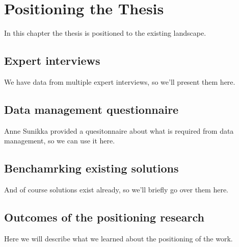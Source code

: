 \chapter{Positioning the Thesis}
\label{chapter:positioning}

In this chapter the thesis is positioned to the existing landscape.

\section{Expert interviews}
\label{sec:expert_interviews}

We have data from multiple expert interviews, so we'll present them here.

\section{Data management questionnaire}
\label{sec:questionnaire}

Anne Sunikka provided a quesitonnaire about what is required from data
management, so we can use it here.

\section{Benchamrking existing solutions}
\label{sec:benchamrking}

And of course solutions exist already, so we'll briefly go over them here.

\section{Outcomes of the positioning research}
\label{sec:positioning_outcomes}

Here we will describe what we learned about the positioning of the work.
